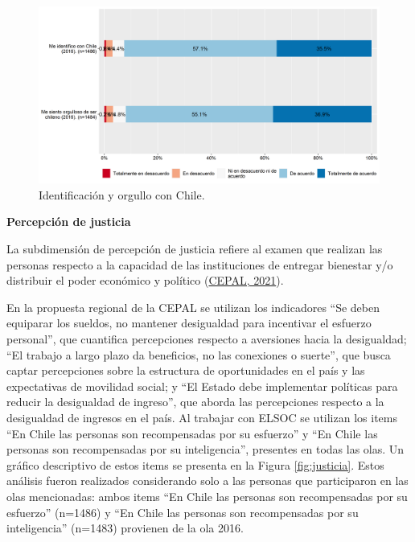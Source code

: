 \documentclass[
  12pt,
]{book}
\begin{document}
\begin{figure}[H]

{\centering \includegraphics[width=1\linewidth,height=1\textheight]{output/graphs/identificacion} 

}

\caption{Identificación y orgullo con Chile.}\label{fig:identificacion}
\end{figure}

\textbf{Percepción de justicia}

La subdimensión de percepción de justicia refiere al examen que realizan las personas respecto a la capacidad de las instituciones de entregar bienestar y/o distribuir el poder económico y político (\protect\hyperlink{ref-cepal_cohesion_2021}{CEPAL, 2021}).

En la propuesta regional de la CEPAL se utilizan los indicadores ``Se deben equiparar los sueldos, no mantener desigualdad para incentivar el esfuerzo personal'', que cuantifica percepciones respecto a aversiones hacia la desigualdad; ``El trabajo a largo plazo da beneficios, no las conexiones o suerte'', que busca captar percepciones sobre la estructura de oportunidades en el país y las expectativas de movilidad social; y ``El Estado debe implementar políticas para reducir la desigualdad de ingreso'', que aborda las percepciones respecto a la desigualdad de ingresos en el país. Al trabajar con ELSOC se utilizan los items ``En Chile las personas son recompensadas por su esfuerzo'' y ``En Chile las personas son recompensadas por su inteligencia'', presentes en todas las olas. Un gráfico descriptivo de estos items se presenta en la Figura \ref{fig:justicia}. Estos análisis fueron realizados considerando solo a las personas que participaron en las olas mencionadas: ambos items ``En Chile las personas son recompensadas por su esfuerzo'' (n=1486) y ``En Chile las personas son recompensadas por su inteligencia'' (n=1483) provienen de la ola 2016.
\end{document}
